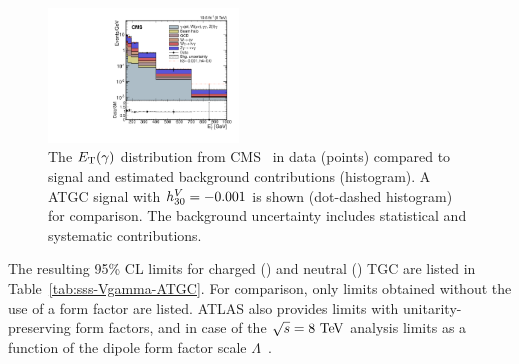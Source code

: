% 
\begin{figure}[htbp]
  \begin{center}
  \includegraphics[width=0.45\textwidth]{figures/sss-inclboson-diboson-Vgamma-zgamvvgamptgam.pdf}
  \caption{ 
  The $E_{\mathrm{T}}(\gamma)$ distribution from CMS~\cite{Khachatryan:2016yro} in data (points) compared to signal and estimated background contributions (histogram). A ATGC signal with $h_{30}^V=-0.001$ is 
  shown (dot-dashed histogram) for comparison. The background uncertainty includes statistical and systematic contributions. 
}
\label{fig:sss-inclboson-diboson-Vgamma-zgamvvgamptgam}
\end{center}
\end{figure}

The resulting 95\% CL limits for charged (\Wg) and neutral (\Zg) TGC are listed in Table~\ref{tab:sss-Vgamma-ATGC}. For comparison, only limits obtained without the use of a form factor are listed. ATLAS
also provides limits with unitarity-preserving form factors, and in case of the $\rts=8\TeV$  analysis limits as a function of the dipole form factor scale $\Lambda$~\cite{Aad:2016sau}. 

